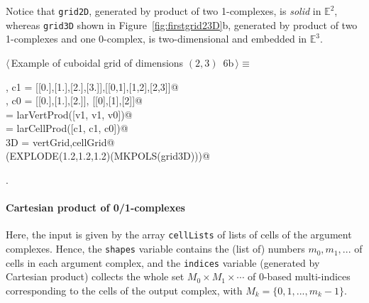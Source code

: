 \documentclass[11pt,oneside]{article}	%
\def\E{\mathbb{E}}
\begin{document}
Notice that \texttt{grid2D}, generated by product of two 1-complexes, is \emph{solid} in $\E^2$, whereas \texttt{grid3D} shown in Figure~\ref{fig:firstgrid23D}b, generated by product of two 1-complexes and one 0-complex, is two-dimensional and embedded in $\E^3$.

\begin{flushleft} \small \label{scrap8}
\protect{}$\langle\,$Example of cuboidal grid of dimensions $(2,3)$\nobreak\ {\footnotesize 6b}$\,\rangle\equiv$
\vspace{-1ex}
\begin{list}{}{} \item
\mbox{}, c1 = [[0.],[1.],[2.],[3.]],[[0,1],[1,2],[2,3]]@\\
\mbox{}, c0 = [[0.],[1.],[2.]], [[0],[1],[2]]@\\
\mbox{}\verb@vertGrid = larVertProd([v1, v1, v0])@\\
\mbox{}\verb@cellGrid = larCellProd([c1, c1, c0])@\\
\mbox{}\verb@grid3D = vertGrid,cellGrid@\\
\mbox{}\verb@VIEW(EXPLODE(1.2,1.2,1.2)(MKPOLS(grid3D)))@\\
\mbox{}\verb@@{\NWsep}
\end{list}
\vspace{-1ex}
\footnotesize\addtolength{\baselineskip}{-1ex}
\begin{list}{}{\setlength{\itemsep}{-\parsep}\setlength{\itemindent}{-\leftmargin}}
\item {\NWtxtMacroNoRef}.
\end{list}
\end{flushleft}

\paragraph{Cartesian product of 0/1-complexes}
Here, the input is given by the array \texttt{cellLists} of lists of cells of the argument complexes. Hence, the \texttt{shapes} variable contains the (list of) numbers $m_0, m_1, ...$ of cells in each argument complex, and the \texttt{indices} variable (generated by Cartesian product) collects the whole set $M_0 \times M_1 \times \cdots$ of 0-based multi-indices corresponding to the cells of the output complex, with $M_k = \{0,1,...,m_{k}-1\}$.
\end{document}
